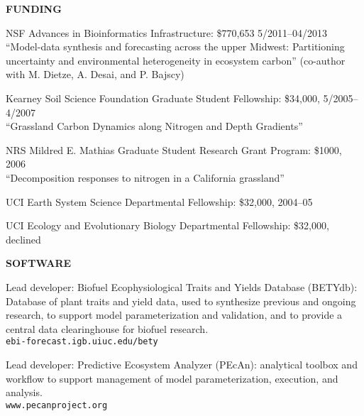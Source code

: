 \documentclass[10pt,twoside]{article}
\begin{document}
\textbf{FUNDING}
\begin{itemize*}
\item NSF Advances in Bioinformatics Infrastructure: \$770,653 5/2011--04/2013\\
``Model-data synthesis and forecasting across the upper Midwest: Partitioning uncertainty and environmental heterogeneity in ecosystem carbon''  (co-author with M. Dietze, A. Desai, and P. Bajscy)
  
\item Kearney Soil Science Foundation Graduate Student Fellowship:  \$34,000, 5/2005--4/2007 \\ 
``Grassland Carbon Dynamics along Nitrogen and Depth Gradients'' 
\item NRS Mildred E. Mathias Graduate Student Research Grant Program: \$1000, 2006 \\
``Decomposition responses to nitrogen in a California grassland'' 
\item UCI Earth System Science Departmental Fellowship: \$32,000, 2004--05
\item UCI Ecology and Evolutionary Biology Departmental Fellowship: \$32,000, declined
\end{itemize*}
\newpage
\textbf{SOFTWARE}
\vspace{-0.5em}
\begin{itemize*}
\item  Lead developer: Biofuel Ecophysiological Traits and Yields Database (BETYdb): Database of plant traits and yield data, used to synthesize previous and ongoing research, to support model parameterization and validation, and to provide a central data clearinghouse for biofuel research. \\\texttt{ebi-forecast.igb.uiuc.edu/bety}
\item  Lead developer: Predictive Ecosystem Analyzer (PEcAn): analytical toolbox and workflow to support management of model parameterization, execution, and analysis.  \\\texttt{www.pecanproject.org}
\end{itemize*}
\end{document}

